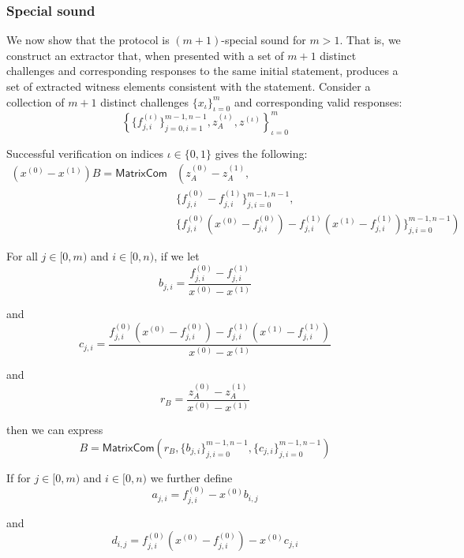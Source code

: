 \begin{appendices}
\subsubsection{Special sound}
\label{appendix:grootle-proof-security-special-sound}

We now show that the protocol is $(m+1)$-special sound for $m > 1$. That is, we construct an extractor that, when presented with a set of $m + 1$ distinct challenges and corresponding responses to the same initial statement, produces a set of extracted witness elements consistent with the statement. Consider a collection of $m+1$ distinct challenges $\{x_{\iota}\}^m_{\iota=0}$ and corresponding valid responses:
\[ \left\{ \{f^{(\iota)}_{j,i}\}^{m-1,n-1}_{j=0,i=1}, z^{(\iota)}_A, z^{(\iota)} \right\}^m_{\iota=0} \]

Successful verification on indices $\iota \in \{0,1\}$ gives the following:\vspace{.115cm}
\begin{align*}
    (x^{(0)} - x^{(1)}) B = \mathsf{MatrixCom} &\left( z^{(0)}_A - z^{(1)}_A, \right. \\
    &\left. \{f^{(0)}_{j,i} - f^{(1)}_{j,i}\}^{m-1,n-1}_{j,i=0}, \right. \\
    &\left. \{f^{(0)}_{j,i}(x^{(0)} - f^{(0)}_{j,i}) - f^{(1)}_{j,i}(x^{(1)} - f^{(1)}_{j,i})\}^{m-1,n-1}_{j,i=0} \right)
\end{align*}

For all $j \in [0,m)$ and $i \in [0,n)$, if we let\vspace{.115cm}
\[ b_{j,i} = \frac{f^{(0)}_{j,i} - f^{(1)}_{j,i}}{x^{(0)} - x^{(1)}} \]

and\vspace{.115cm}
\[ c_{j,i} = \frac{f^{(0)}_{j,i}(x^{(0)} - f^{(0)}_{j,i}) - f^{(1)}_{j,i}(x^{(1)} - f^{(1)}_{j,i})}{x^{(0)} - x^{(1)}} \]

and\vspace{.115cm}
\[r_B = \frac{z^{(0)}_A - z^{(1)}_A}{x^{(0)} - x^{(1)}}\]

then we can express\vspace{.115cm}
\[ B = \mathsf{MatrixCom} \left(  r_B, \{b_{j,i}\}^{m-1,n-1}_{j,i=0}, \{c_{j,i}\}^{m-1,n-1}_{j,i=0}\right) \]

If for $j \in [0,m)$ and $i \in [0,n)$ we further define\vspace{.115cm}
\[ a_{j,i} = f^{(0)}_{j,i} - x^{(0)} b_{i,j} \]

and
\[ d_{i,j} = f^{(0)}_{j,i}(x^{(0)} - f^{(0)}_{j,i}) - x^{(0)} c_{j,i} \]


\end{appendices}
